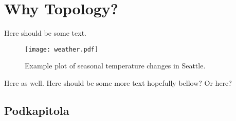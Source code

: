 \chapter{Why Topology?}
\graphicspath{ {/home/tomasp/Dokumenty/Master_Thesis/figures/} }

Here should be some text.
\begin{figure}[h]
  \caption{Example plot of seasonal temperature changes in Seattle.}
  \texttt{[image: weather.pdf]}
  \centering
\end{figure}
Here as well. Here should be some more text hopefully bellow?
Or here?

\section{Podkapitola}

